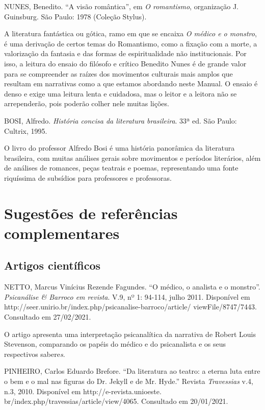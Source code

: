 \documentclass[12pt]{extarticle}
\begin{document}
NUNES, Benedito. ``A visão romântica'', em \emph{O romantismo},
organização J. Guinsburg. São Paulo: 1978 (Coleção Stylus).

A literatura fantástica ou gótica, ramo em que se encaixa \emph{O médico
e o monstro}, é uma derivação de certos temas do Romantismo, como a
fixação com a morte, a valorização da fantasia e das formas de
espiritualidade não institucionais. Por isso, a leitura do ensaio do
filósofo e crítico Benedito Nunes é de grande valor para se compreender
as raízes dos movimentos culturais mais amplos que resultam em
narrativas como a que estamos abordando neste Manual. O ensaio é denso e
exige uma leitura lenta e cuidadosa, mas o leitor e a leitora não se
arrependerão, pois poderão colher nele muitas lições.

BOSI, Alfredo. \emph{História concisa da literatura brasileira}. 33ª ed.
São Paulo: Cultrix, 1995.

O livro do professor Alfredo Bosi é uma história panorâmica da
literatura brasileira, com muitas análises gerais sobre movimentos e
períodos literários, além de análises de romances, peças teatrais e
poemas, representando uma fonte riquíssima de subsídios para professores
e professoras.

\section{Sugestões de referências complementares}

\subsection{Artigos científicos}

NETTO, Marcus Vinícius Rezende Fagundes. ``O médico, o analista e o
monstro''. \emph{Psicanálise \& Barroco em revista}. V.9, nº 1: 94-114,
julho 2011. Disponível em
http://seer.unirio.br/index.php/psicanalise-barroco/article/
viewFile/8747/7443. Consultado em 27/02/2021.

O artigo apresenta uma interpretação psicanalítica da narrativa de
Robert Louis Stevenson, comparando os papéis do médico e do psicanalista
e os seus respectivos sabere\emph{s}.

PINHEIRO, Carlos Eduardo Brefore. ``Da literatura ao teatro: a eterna
luta entre o bem e o mal nas figuras do Dr. Jekyll e de Mr. Hyde.''
Revista \emph{Travessias} v.4, n.3, 2010. Disponível em
http://e-revista.unioeste. br/index.php/travessias/article/view/4065.
Consultado em 20/01/2021.
\end{document}

